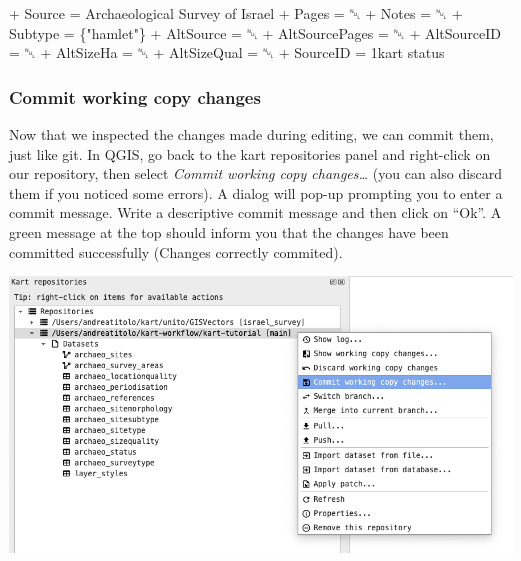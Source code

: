 \documentclass[
  letterpaper,
  DIV=11,
  numbers=noendperiod]{scrartcl}
\newenvironment{Shaded}{\begin{snugshade}}{\end{snugshade}}
\newcommand{\ExtensionTok}[1]{\textcolor[rgb]{0.55,0.91,0.99}{#1}}
\newcommand{\NormalTok}[1]{\textcolor[rgb]{0.97,0.97,0.95}{#1}}
\newcommand{\StringTok}[1]{\textcolor[rgb]{0.95,0.98,0.55}{#1}}
\begin{document}
\begin{tcolorbox}
\begin{Shaded}
\begin{Highlighting}[]
\ExtensionTok{+}\NormalTok{                                   Source = Archaeological Survey of Israel}
\ExtensionTok{+}\NormalTok{                                    Pages = ␀}
\ExtensionTok{+}\NormalTok{                                    Notes = ␀}
\ExtensionTok{+}\NormalTok{                                  Subtype = \{}\StringTok{"hamlet"}\NormalTok{\}}
\ExtensionTok{+}\NormalTok{                                AltSource = ␀}
\ExtensionTok{+}\NormalTok{                           AltSourcePages = ␀}
\ExtensionTok{+}\NormalTok{                              AltSourceID = ␀}
\ExtensionTok{+}\NormalTok{                                AltSizeHa = ␀}
\ExtensionTok{+}\NormalTok{                              AltSizeQual = ␀}
\ExtensionTok{+}\NormalTok{                                 SourceID = 1kart status}
\end{Highlighting}
\end{Shaded}

\end{tcolorbox}

\subsubsection{Commit working copy
changes}\label{commit-working-copy-changes}

Now that we inspected the changes made during editing, we can commit
them, just like git. In QGIS, go back to the kart repositories panel and
right-click on our repository, then select \emph{Commit working copy
changes\ldots{}} (you can also discard them if you noticed some errors).
A dialog will pop-up prompting you to enter a commit message. Write a
descriptive commit message and then click on ``Ok''. A green message at
the top should inform you that the changes have been committed
successfully (Changes correctly commited).

\begin{center}
\includegraphics{img/kart-panel-commit.png}
\end{center}
\end{document}
